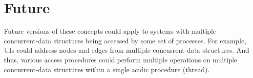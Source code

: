 \section{Future}

Future versions of these concepts could apply to systems with multiple concurrent-data structures being accessed by some set of processes. For example, UIs could address nodes and edges from multiple concurrent-data structures. And thus, various access procedures could perform multiple operations on multiple concurrent-data structures within a single acidic procedure (thread).

